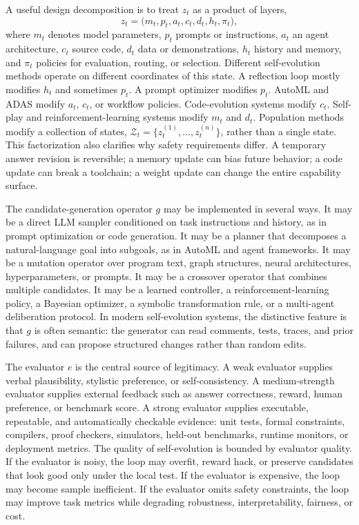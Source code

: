 A useful design decomposition is to treat $z_t$ as a product of layers,
\begin{equation}
  z_t = \bigl(m_t, p_t, a_t, c_t, d_t, h_t, \pi_t\bigr),
  \label{eq:state-factorization}
\end{equation}
where $m_t$ denotes model parameters, $p_t$ prompts or instructions, $a_t$ an agent architecture, $c_t$ source code, $d_t$ data or demonstrations, $h_t$ history and memory, and $\pi_t$ policies for evaluation, routing, or selection.  Different self-evolution methods operate on different coordinates of this state.  A reflection loop mostly modifies $h_t$ and sometimes $p_t$.  A prompt optimizer modifies $p_t$.  AutoML and ADAS modify $a_t$, $c_t$, or workflow policies.  Code-evolution systems modify $c_t$.  Self-play and reinforcement-learning systems modify $m_t$ and $d_t$.  Population methods modify a collection of states, $\mathcal{Z}_t = \{z_t^{(1)},\ldots,z_t^{(n)}\}$, rather than a single state.  This factorization also clarifies why safety requirements differ.  A temporary answer revision is reversible; a memory update can bias future behavior; a code update can break a toolchain; a weight update can change the entire capability surface.

The candidate-generation operator $g$ may be implemented in several ways.  It may be a direct LLM sampler conditioned on task instructions and history, as in prompt optimization or code generation.  It may be a planner that decomposes a natural-language goal into subgoals, as in AutoML and agent frameworks.  It may be a mutation operator over program text, graph structures, neural architectures, hyperparameters, or prompts.  It may be a crossover operator that combines multiple candidates.  It may be a learned controller, a reinforcement-learning policy, a Bayesian optimizer, a symbolic transformation rule, or a multi-agent deliberation protocol.  In modern self-evolution systems, the distinctive feature is that $g$ is often semantic: the generator can read comments, tests, traces, and prior failures, and can propose structured changes rather than random edits.

The evaluator $e$ is the central source of legitimacy.  A weak evaluator supplies verbal plausibility, stylistic preference, or self-consistency.  A medium-strength evaluator supplies external feedback such as answer correctness, reward, human preference, or benchmark score.  A strong evaluator supplies executable, repeatable, and automatically checkable evidence: unit tests, formal constraints, compilers, proof checkers, simulators, held-out benchmarks, runtime monitors, or deployment metrics.  The quality of self-evolution is bounded by evaluator quality.  If the evaluator is noisy, the loop may overfit, reward hack, or preserve candidates that look good only under the local test.  If the evaluator is expensive, the loop may become sample inefficient.  If the evaluator omits safety constraints, the loop may improve task metrics while degrading robustness, interpretability, fairness, or cost.

